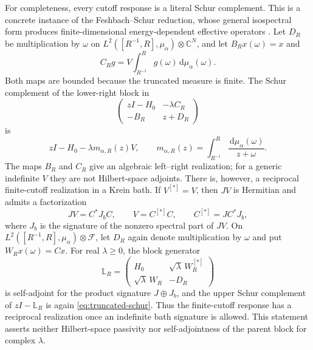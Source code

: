 \documentclass[11pt,reqno]{amsart}
\theoremstyle{remark}
\newcommand{\C}{\mathbb C}
\newcommand{\dd}{\,\mathrm d}
\begin{document}
For completeness, every cutoff response is a literal Schur complement.  This
is a concrete instance of the Feshbach--Schur reduction, whose general
isospectral form produces finite-dimensional energy-dependent effective
operators \cite{DussonSigalStamm2021}.
Let $D_R$ be multiplication by $\omega$ on
$L^2([R^{-1},R],\mu_\alpha)\otimes\C^N$, and let
$B_Rx(\omega)=x$ and
\begin{equation}\label{eq:C-R}
 C_Rg=V\int_{R^{-1}}^R g(\omega)\dd\mu_\alpha(\omega).
\end{equation}
Both maps are bounded because the truncated measure is finite.  The Schur
complement of the lower-right block in
\begin{equation}\label{eq:block-pencil}
 \begin{pmatrix}
 zI-H_0&-\lambda C_R\\
 -B_R&z+D_R
 \end{pmatrix}
\end{equation}
is
\begin{equation}\label{eq:truncated-schur}
 zI-H_0-\lambda m_{\alpha,R}(z)V,
 \qquad
 m_{\alpha,R}(z)=
 \int_{R^{-1}}^R\frac{\dd\mu_\alpha(\omega)}{z+\omega}.
\end{equation}
The maps $B_R$ and $C_R$ give an algebraic left--right realization; for a
generic indefinite $V$ they are not Hilbert-space adjoints.  There is,
however, a reciprocal finite-cutoff realization in a Krein bath.  If
$V^{[*]}=V$, then $JV$ is Hermitian and admits a factorization
\begin{equation}\label{eq:krein-factorization}
 JV=C^*J_bC,
 \qquad
 V=C^{[*]}C,
 \qquad C^{[*]}=JC^*J_b,
\end{equation}
where $J_b$ is the signature of the nonzero spectral part of $JV$.  On
$L^2([R^{-1},R],\mu_\alpha)\otimes\mathcal F$, let $D_R$ again denote
multiplication by $\omega$ and put $W_Rx(\omega)=Cx$.  For real
$\lambda\geq0$, the block generator
\begin{equation}\label{eq:krein-bath-generator}
 \mathbb L_R=
 \begin{pmatrix}
  H_0&\sqrt\lambda\,W_R^{[*]}\\
  \sqrt\lambda\,W_R&-D_R
 \end{pmatrix}
\end{equation}
is self-adjoint for the product signature $J\oplus J_b$, and the upper Schur
complement of $zI-\mathbb L_R$ is again \eqref{eq:truncated-schur}.  Thus the
finite-cutoff response has a reciprocal realization once an indefinite bath
signature is allowed.  This statement asserts neither Hilbert-space
passivity nor self-adjointness of the parent block for complex $\lambda$.
\end{document}
